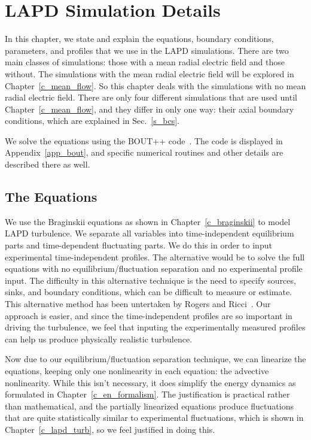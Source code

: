 \chapter{LAPD Simulation Details}
\label{c_lapd_sim}

In this chapter, we state and explain the equations, boundary conditions, parameters, and profiles that we use in the LAPD simulations. 
There are two main classes of simulations: those with a mean radial electric field and those without. The simulations
with the mean radial electric field will be explored in Chapter~\ref{c_mean_flow}. So this chapter deals with the simulations with no mean radial electric field. There are only four different
simulations that are used until Chapter~\ref{c_mean_flow}, and they differ in only one way: their axial boundary conditions, which are explained in Sec.~\ref{s_bcs}.

We solve the equations using the BOUT++ code~\cite{dudson2009}. The code is displayed in Appendix~\ref{app_bout}, and specific numerical routines and other details are described there as well.

\section{The Equations}
\label{s_equations}

We use the Braginskii equations as shown in Chapter~\ref{c_braginskii} to model LAPD turbulence. We separate all variables into time-independent equilibrium parts and time-dependent
fluctuating parts.  We do this in order to input experimental time-independent profiles. The alternative would be to solve the full equations with no equilibrium/fluctuation separation
and no experimental profile input. The difficulty in this alternative technique is the need to specify sources, sinks, and boundary conditions, which can be difficult to measure or estimate.
This alternative method has been untertaken by Rogers and Ricci~\cite{rogers2010}. Our approach is easier, and since the time-independent profiles are so important in driving the turbulence,
we feel that inputing the experimentally measured profiles can help us produce physically realistic turbulence.

Now due to our equilibrium/fluctuation separation technique, we can linearize the equations, keeping only one nonlinearity in each equation: the
advective nonlinearity. While this isn't necessary, it does simplify the energy dynamics as formulated in Chapter~\ref{c_en_formalism}. The justification is practical rather than mathematical,
and the partially linearized equations produce fluctuations that are quite statistically similar to experimental fluctuations, which is shown in Chapter~\ref{c_lapd_turb}, so we feel justified
in doing this.

